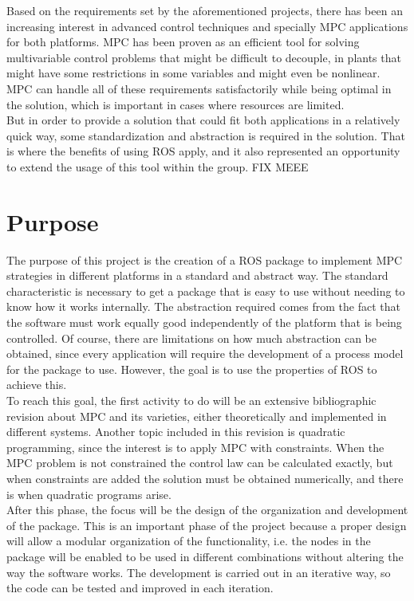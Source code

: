 Based on the requirements set by the aforementioned projects, there has been an increasing interest in advanced control techniques and specially MPC applications for both platforms. MPC has been proven as an efficient tool for solving multivariable control problems that might be difficult to decouple, in plants that might have some restrictions in some variables and might even be nonlinear. MPC can handle all of these requirements satisfactorily while being optimal in the solution, which is important in cases where resources are limited.\\




But in order to provide a solution that could fit both applications in a relatively quick way, some standardization and abstraction is required in the solution. That is where the benefits of using ROS apply, and it also represented an opportunity to extend the usage of this tool within the group. FIX MEEE


\section{Purpose}

The purpose of this project is the creation of a ROS package to implement MPC strategies in different platforms in a standard and abstract way. The standard characteristic is necessary to get a package that is easy to use without needing to know how it works internally. The abstraction required comes from the fact that the software must work equally good independently of the platform that is being controlled. Of course, there are limitations on how much abstraction can be obtained, since every application will require the development of a process model for the package to use. However, the goal is to use the properties of ROS to achieve this.\\

To reach this goal, the first activity to do will be an extensive bibliographic revision about MPC and its varieties, either theoretically and implemented in different systems. Another topic included in this revision is quadratic programming, since the interest is to apply MPC with constraints. When the MPC problem is not constrained the control law can be calculated exactly, but when constraints are added the solution must be obtained numerically, and there is when quadratic programs arise. \\

After this phase, the focus will be the design of the organization and development of the package. This is an important phase of the project because a proper design will allow a modular organization of the functionality, i.e. the nodes in the package will be enabled to be used in different combinations without altering the way the software works. The development is carried out in an iterative way, so the code can be tested and improved in each iteration. \\

